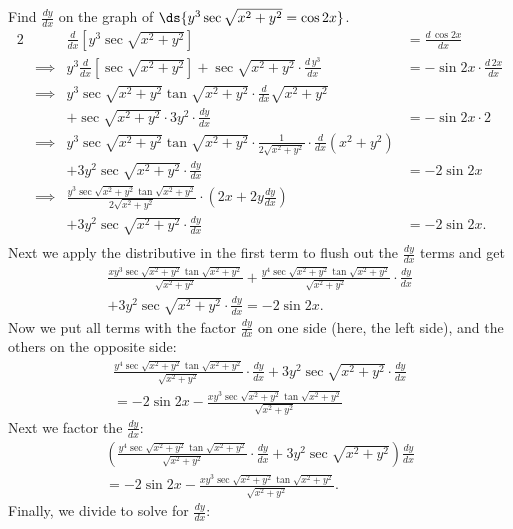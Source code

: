 \bex Find $\frac{dy}{dx}$ on the graph of 
$\ds{y^3\sec\sqrt{x^2+y^2}=\cos2x}$.
\begin{alignat*}{2}
&&\frac{d}{dx}\left[y^3\sec\sqrt{x^2+y^2}\right]&=\frac{d\,\cos 2x}{dx}\\
&\implies&y^3\frac{d}{dx}\left[\sec\sqrt{x^2+y^2}\right]
+\sec\sqrt{x^2+y^2}\cdot\frac{d\,y^3}{dx}
&=-\sin2x\cdot\frac{d\,2x}{dx}\\ 
&\implies& y^3\sec\sqrt{x^2+y^2}\tan\sqrt{x^2+y^2}
\cdot\frac{d}{dx}\sqrt{x^2+y^2}\quad&\\ 
&&+\sec\sqrt{x^2+y^2}\cdot 3y^2\cdot\frac{dy}{dx}
&=-\sin2x\cdot2\\ 
&\implies&y^3\sec\sqrt{x^2+y^2}\tan\sqrt{x^2+y^2}
\cdot\frac1{2\sqrt{x^2+y^2}}\cdot\frac{d}{dx}(x^2+y^2)
&\\
&&+3y^2\sec\sqrt{x^2+y^2}\cdot\frac{dy}{dx}&=-2\sin2x\\ 
&\implies&\frac{y^3\sec\sqrt{x^2+y^2}\tan\sqrt{x^2+y^2}
}{2\sqrt{x^2+y^2}}\cdot\left(2x+2y\frac{dy}{dx}\right)\qquad\qquad&\\
&&+3y^2
\sec\sqrt{x^2+y^2}\cdot\frac{dy}{dx}
&=-2\sin2x.\\
\end{alignat*}
Next we apply the distributive in the first term to flush out
the $\frac{dy}{dx}$ terms and get
\begin{multline*}
\frac{xy^3\sec\sqrt{x^2+y^2}\tan\sqrt{x^2+y^2}}{\sqrt{x^2+y^2}}
+\frac{y^4\sec\sqrt{x^2+y^2}\tan\sqrt{x^2+y^2}}{\sqrt{x^2+y^2}}
\cdot\frac{dy}{dx}\\
+3y^2\sec\sqrt{x^2+y^2}\cdot\frac{dy}{dx}=-2\sin2x.
\end{multline*}
Now we put all terms with the factor $\frac{dy}{dx}$ on one side
(here, the left side), and the others on the opposite side:
\begin{multline*}
\frac{y^4\sec\sqrt{x^2+y^2}\tan\sqrt{x^2+y^2}}{\sqrt{x^2+y^2}}
\cdot\frac{dy}{dx}+3y^2\sec\sqrt{x^2+y^2}\cdot\frac{dy}{dx}
\\
=-2\sin2x-\frac{xy^3\sec\sqrt{x^2+y^2}\tan\sqrt{x^2+y^2}}{\sqrt{x^2+y^2}}
\end{multline*}
Next we factor the $\frac{dy}{dx}$:
\begin{multline*}
\left(\frac{y^4\sec\sqrt{x^2+y^2}\tan\sqrt{x^2+y^2}}{\sqrt{x^2+y^2}}
\cdot\frac{dy}{dx}+3y^2\sec\sqrt{x^2+y^2}\right)\frac{dy}{dx}
\\
=-2\sin2x-\frac{xy^3\sec\sqrt{x^2+y^2}\tan\sqrt{x^2+y^2}}{\sqrt{x^2+y^2}}.
\end{multline*}
Finally, we divide to solve for $\frac{dy}{dx}$:


